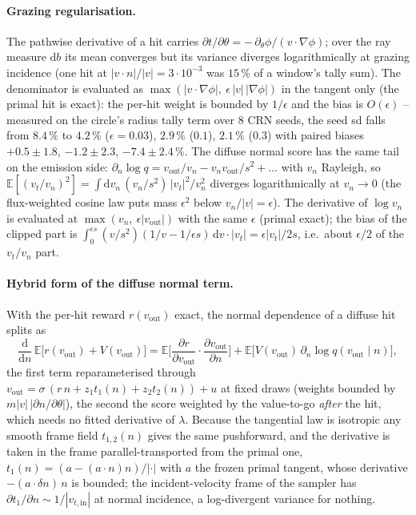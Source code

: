 \documentclass[11pt,a4paper]{article}
\numberwithin{equation}{section}
\newcommand{\dd}{\mathrm{d}}
\begin{document}
\paragraph{Grazing regularisation.}
The pathwise derivative of a hit carries $\partial t/\partial\theta = -\,\partial_\theta\phi
/ (v\cdot\nabla\phi)$; over the ray measure $\mathrm db$ its mean converges but its
variance diverges logarithmically at grazing incidence (one hit at $|v\cdot n|/|v| =
3\cdot10^{-3}$ was $15\,\%$ of a window's tally sum).  The denominator is evaluated as
$\max(|v\cdot\nabla\phi|,\ \epsilon\,|v|\,|\nabla\phi|)$ in the tangent only (the primal
hit is exact): the per-hit weight is bounded by $1/\epsilon$ and the bias is
$O(\epsilon)$ -- measured on the circle's radius tally term over 8 CRN seeds, the seed
sd falls from $8.4\,\%$ to $4.2\,\%$ ($\epsilon = 0.03$), $2.9\,\%$ ($0.1$), $2.1\,\%$
($0.3$) with paired biases $+0.5\pm1.8$, $-1.2\pm2.3$, $-7.4\pm2.4\,\%$.
The diffuse normal score has the same tail on the emission side: $\partial_n \log q =
v_{\mathrm{out}}/v_n - v_n v_{\mathrm{out}}/s^2 + \dots$ with $v_n$ Rayleigh, so
$\mathbb E[(v_t/v_n)^2] = \int \dd v_n\,(v_n/s^2)\,|v_t|^2/v_n^2$ diverges
logarithmically at $v_n \to 0$ (the flux-weighted cosine law puts mass $\epsilon^2$
below $v_n/|v| = \epsilon$).  The derivative of $\log v_n$ is evaluated at
$\max(v_n,\ \epsilon |v_{\mathrm{out}}|)$ with the same $\epsilon$ (primal exact); the
bias of the clipped part is $\int_0^{\epsilon s} (v/s^2)(1/v - 1/\epsilon s)\,\dd v
\cdot |v_t| = \epsilon |v_t| / 2s$, i.e.\ about $\epsilon/2$ of the $v_t/v_n$ part.

\paragraph{Hybrid form of the diffuse normal term.}
With the per-hit reward $r(v_{\mathrm{out}})$ exact, the normal dependence of a diffuse
hit splits as
\[
\frac{\dd}{\dd n}\,\mathbb E\big[r(v_{\mathrm{out}}) + V(v_{\mathrm{out}})\big]
= \mathbb E\Big[\frac{\partial r}{\partial v_{\mathrm{out}}}\cdot
\frac{\partial v_{\mathrm{out}}}{\partial n}\Big]
+ \mathbb E\big[V(v_{\mathrm{out}})\,\partial_n \log q(v_{\mathrm{out}}\mid n)\big],
\]
the first term reparameterised through $v_{\mathrm{out}} = \sigma\,(r\,n + z_1 t_1(n)
+ z_2 t_2(n)) + u$ at fixed draws (weights bounded by $m|v|\,|\partial n/\partial\theta|$),
the second the score weighted by the value-to-go \emph{after} the hit, which needs no
fitted derivative of $\lambda$.  Because the tangential law is isotropic any smooth
frame field $t_{1,2}(n)$ gives the same pushforward, and the derivative is taken in the
frame parallel-transported from the primal one, $t_1(n) = (a - (a\cdot n)n)/|\cdot|$
with $a$ the frozen primal tangent, whose derivative $-(a\cdot\delta n)\,n$ is bounded;
the incident-velocity frame of the sampler has $\partial t_1/\partial n \sim 1/|v_{t,\mathrm{in}}|$
at normal incidence, a log-divergent variance for nothing.
\end{document}
